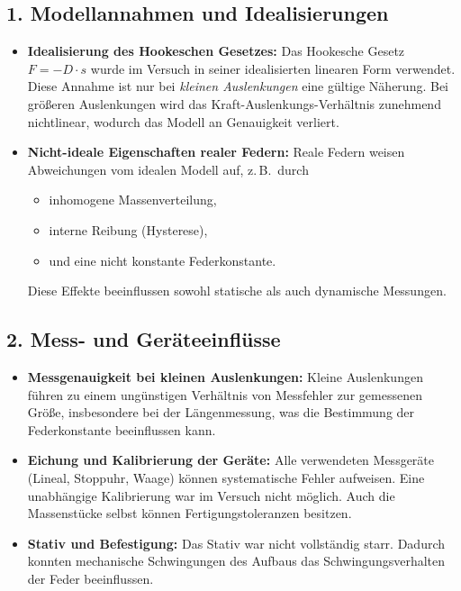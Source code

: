 \subsection*{1. Modellannahmen und Idealisierungen}

\begin{itemize}
    \item \textbf{Idealisierung des Hookeschen Gesetzes:} Das Hookesche Gesetz $F = -D \cdot s$ wurde im Versuch in seiner idealisierten linearen Form verwendet. Diese Annahme ist nur bei \emph{kleinen Auslenkungen} eine gültige Näherung. Bei größeren Auslenkungen wird das Kraft-Auslenkungs-Verhältnis zunehmend nichtlinear, wodurch das Modell an Genauigkeit verliert.
    
    \item \textbf{Nicht-ideale Eigenschaften realer Federn:} Reale Federn weisen Abweichungen vom idealen Modell auf, z.\,B.\ durch
    \begin{itemize}
        \item inhomogene Massenverteilung,
        \item interne Reibung (Hysterese),
        \item und eine nicht konstante Federkonstante.
    \end{itemize}
    Diese Effekte beeinflussen sowohl statische als auch dynamische Messungen.
\end{itemize}

\subsection*{2. Mess- und Geräteeinflüsse}

\begin{itemize}
    \item \textbf{Messgenauigkeit bei kleinen Auslenkungen:} Kleine Auslenkungen führen zu einem ungünstigen Verhältnis von Messfehler zur gemessenen Größe, insbesondere bei der Längenmessung, was die Bestimmung der Federkonstante beeinflussen kann.
    
    \item \textbf{Eichung und Kalibrierung der Geräte:} Alle verwendeten Messgeräte (Lineal, Stoppuhr, Waage) können systematische Fehler aufweisen. Eine unabhängige Kalibrierung war im Versuch nicht möglich. Auch die Massenstücke selbst können Fertigungstoleranzen besitzen.
    
    \item \textbf{Stativ und Befestigung:} Das Stativ war nicht vollständig starr. Dadurch konnten mechanische Schwingungen des Aufbaus das Schwingungsverhalten der Feder beeinflussen.
\end{itemize}

